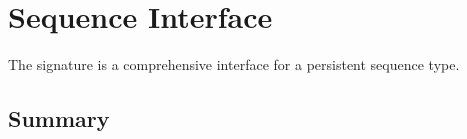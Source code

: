 \chapter{Sequence Interface}
\label{ch:seq-interface}

\begin{cluster}
\label{grp:grm:seq-interface::sequence}

\begin{gram}
\label{grm:seq-interface::sequence}
\label{ch:seq-interface}
\begin{preamble}
The  signature is a comprehensive interface for a
persistent sequence type.
\end{preamble}

\end{gram}
\end{cluster}


\section{Summary}
\label{sec:seq-interface::summary}

